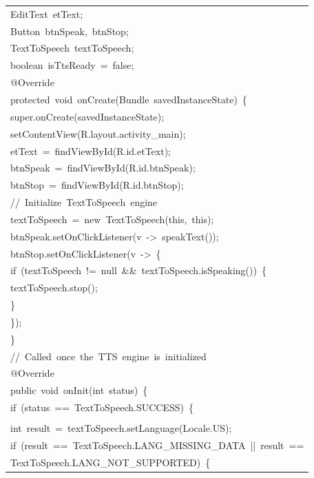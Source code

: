 \documentclass[a4paper,12pt]{article}
\begin{document}
\begin{longtable}{|p{}|}
{\ttfamily\small EditText\ etText;} \\
{\ttfamily\small Button\ btnSpeak,\ btnStop;} \\
{\ttfamily\small TextToSpeech\ textToSpeech;} \\
{\ttfamily\small boolean\ isTtsReady\ =\ false;} \\
{\ttfamily\small @Override} \\
{\ttfamily\small protected\ void\ onCreate(Bundle\ savedInstanceState)\ \{} \\
{\ttfamily\small super.onCreate(savedInstanceState);} \\
{\ttfamily\small setContentView(R.layout.activity\_main);} \\
{\ttfamily\small etText\ =\ findViewById(R.id.etText);} \\
{\ttfamily\small btnSpeak\ =\ findViewById(R.id.btnSpeak);} \\
{\ttfamily\small btnStop\ =\ findViewById(R.id.btnStop);} \\
{\ttfamily\small //\ Initialize\ TextToSpeech\ engine} \\
{\ttfamily\small textToSpeech\ =\ new\ TextToSpeech(this,\ this);} \\
{\ttfamily\small btnSpeak.setOnClickListener(v\ -\textgreater{}\ speakText());} \\
{\ttfamily\small btnStop.setOnClickListener(v\ -\textgreater{}\ \{} \\
{\ttfamily\small if\ (textToSpeech\ !=\ null\ \&\&\ textToSpeech.isSpeaking())\ \{} \\
{\ttfamily\small textToSpeech.stop();} \\
{\ttfamily\small \}} \\
{\ttfamily\small \});} \\
{\ttfamily\small \}} \\
{\ttfamily\small //\ Called\ once\ the\ TTS\ engine\ is\ initialized} \\
{\ttfamily\small @Override} \\
{\ttfamily\small public\ void\ onInit(int\ status)\ \{} \\
{\ttfamily\small if\ (status\ ==\ TextToSpeech.SUCCESS)\ \{} \\
\strut \\
{\ttfamily\small int\ result\ =\ textToSpeech.setLanguage(Locale.US);} \\
{\ttfamily\small if\ (result\ ==\ TextToSpeech.LANG\_MISSING\_DATA\ ||\ result\ ==} \\
{\ttfamily\small TextToSpeech.LANG\_NOT\_SUPPORTED)\ \{} \\

\end{longtable}
\end{document}
